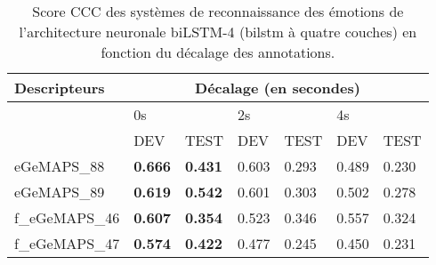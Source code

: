 \begin{table}[h]
  \centering
\begin{tabular}{|l|l|l|l|l|l|l|}
\hline
Descripteurs & \multicolumn{6}{c|}{Décalage (en secondes)} \\ \hline
              &\multicolumn{2}{l|}{0s} &\multicolumn{2}{l|}{2s} &\multicolumn{2}{l|}{4s} \\ \hline
              & DEV             & TEST             & DEV                     & TEST           & DEV                     & TEST           \\ \hline
eGeMAPS\_88  & \textbf{0.666}   & \textbf{0.431}  & 0.603               & 0.293              & 0.489               & 0.230               \\ \hline
eGeMAPS\_89  & \textbf{0.619}   & \textbf{0.542}  & 0.601               & 0.303              & 0.502               & 0.278              \\ \hline
f\_eGeMAPS\_46  & \textbf{0.607}   & \textbf{0.354}  & 0.523               & 0.346              & 0.557               & 0.324              \\ \hline
f\_eGeMAPS\_47  & \textbf{0.574}   & \textbf{0.422}  & 0.477               & 0.245              & 0.450                & 0.231              \\ \hline
\end{tabular}
\caption{Score CCC des systèmes de reconnaissance des émotions de l'architecture neuronale biLSTM-4 (bilstm à quatre couches) en fonction du décalage des annotations.}
\label{tab:decalage}
\end{table}
